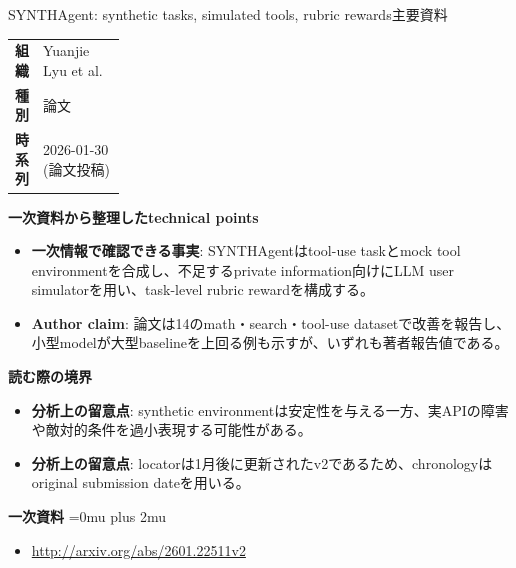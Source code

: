 \begin{technicalnote}{SYNTHAgent: synthetic tasks, simulated tools, rubric rewards}{主要資料}
\begingroup
\begin{tabularx}{\linewidth}{@{}>{\bfseries}p{0.22\linewidth}X@{}}
組織 & Yuanjie Lyu et al. \\
種別 & 論文 \\
時系列 & 2026-01-30 (論文投稿) \\
\end{tabularx}
\smallskip
{\bfseries 一次資料から整理したtechnical points}
\begin{itemize}[leftmargin=1.5em,itemsep=0.35em]
\item \textbf{一次情報で確認できる事実}: SYNTHAgentはtool-use taskとmock tool environmentを合成し、不足するprivate information向けにLLM user simulatorを用い、task-level rubric rewardを構成する。
\item \textbf{Author claim}: 論文は14のmath・search・tool-use datasetで改善を報告し、小型modelが大型baselineを上回る例も示すが、いずれも著者報告値である。
\end{itemize}
\begin{minipage}{\linewidth}
{\bfseries 読む際の境界}
\begin{itemize}[leftmargin=1.5em,itemsep=0.35em]
\item \textbf{分析上の留意点}: synthetic environmentは安定性を与える一方、実APIの障害や敵対的条件を過小表現する可能性がある。
\item \textbf{分析上の留意点}: locatorは1月後に更新されたv2であるため、chronologyはoriginal submission dateを用いる。
\end{itemize}
\begin{samepage}
{\bfseries 一次資料}
\begingroup\sloppy
\Urlmuskip=0mu plus 2mu\relax
\begin{itemize}[leftmargin=1.5em,itemsep=0.25em]
\item {\scriptsize\url{http://arxiv.org/abs/2601.22511v2}}
\end{itemize}
\endgroup
\end{samepage}
\end{minipage}
\endgroup
\end{technicalnote}
\medskip
